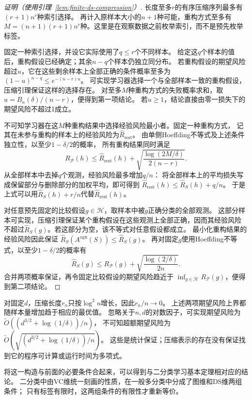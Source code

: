 \begin{proof}[证明（使用引理~\ref{lem:finite-ds-compression}）]
长度至多$r$的有序压缩序列最多有$(r+1)n^r$种索引选择。
再计入原样本大小的$n+1$种可能，重构方式至多有
$M=(n+1)(r+1)n^r$种。这里是在观察数据之前枚举索引，而不是预先枚举标签。

固定一种索引选择，并设它实际使用了$q\leq r$个不同样本。
给定这$q$个样本的值后，重构假设已经确定；其余$n-q$个样本仍独立同分布。
若重构假设的期望风险超过$u$，它在这些剩余样本上全部正确的条件概率至多为
$(1-u)^{n-q}\leq e^{-(n-r)u}$。
可实现学习器选择一个与全部样本一致的重构假设，压缩引理保证这样的选择存在。
对至多$M$种重构方式的失败概率求和，取$u=B_n(\delta)/(n-r)$，便得到第一项结论。
若$u\geq1$，结论直接由零一损失下的期望风险不超过1成立。

不可知学习器在这$M$种重构结果中选择经验风险最小者。固定一种重构方式，
记其在未参与重构的样本上的经验风险为$\hat R_{\mathrm{rest}}$。
由单侧Hoeffding不等式及上述条件独立性，以至少$1-\delta/2$的概率，
所有重构结果同时满足
\[
 R_{\mathcal P}(h)\leq\hat R_{\mathrm{rest}}(h)
       +\sqrt{\frac{\log(2M/\delta)}{2(n-r)}}.
\]
从全部样本中去掉$q$个观测，经验风险最多增加$q/n$：
将全部样本上的平均损失写成保留部分与删除部分的加权平均，即可得到
$\hat R_{\mathrm{rest}}(h)\leq\hat R_S(h)+q/n$。
于是上式可以用$\hat R_S(h)+r/n$代替$\hat R_{\mathrm{rest}}(h)$。

对任意预先固定的比较假设$g\in\mathcal H$，取样本中被$g$正确分类的全部观测。
这部分样本可实现，压缩引理保证某个重构假设在这些观测上全部正确，因而其经验风险
不超过$\hat R_S(g)$。若这部分为空，该不等式对任意假设都成立。
最小化重构结果的经验风险因此保证
$\hat R_S(A^{\mathrm{agn}}(S))\leq\hat R_S(g)$。
再对固定$g$使用Hoeffding不等式，以至少$1-\delta/2$的概率有
\[
 \hat R_S(g)\leq R_{\mathcal P}(g)
       +\sqrt{\frac{\log(2/\delta)}{2n}}.
\]
合并两项概率保证，再令固定比较假设的期望风险趋近于
$\inf_{g\in\mathcal H}R_{\mathcal P}(g)$，便得到第二项结论。
\end{proof}

对固定$d$，压缩长度$r_n$只按$\log^2 n$增长，因此$r_n/n\to0$。
上述两项期望风险上界都随样本量增加趋于相应的最优值。
忽略关于$n,d$的对数因子，可实现期望风险为
$\widetilde O((d^{3/2}+\log(1/\delta))/n)$，
不可知超额期望风险为
$\widetilde O(\sqrt{(d^{3/2}+\log(1/\delta))/n})$。
这些是统计保证；压缩表示的存在没有保证找到它的程序可计算或运行时间为多项式。

将这一构造与前面的必要条件合起来，可以得到与二分类学习基本定理相对应的结论。
二分类中由VC维统一刻画的性质，在一般多分类中分成了图维和DS维两组条件；
只有标签有限时，这两组条件的有限性才重新等价。

